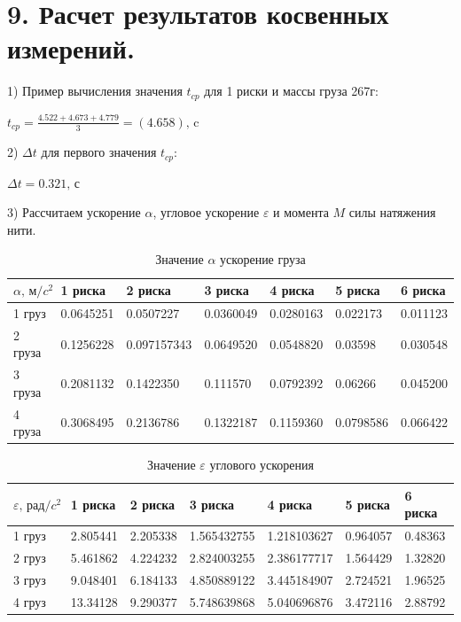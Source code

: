 \documentclass[14pt]{extreport}
\begin{document}
\section*{9. Расчет результатов косвенных измерений.}

1) Пример вычисления значения $t_{cp}$ для 1 риски и массы груза 267г:\\
\begin{center}
$t_{cp} = \frac{4.522 + 4.673 + 4.779}{3} = (4.658)\text{, c}$ \\
\end{center}

2) $\Delta t$ для первого значения $t_{cp}$: \\
\begin{center}
    $\Delta t = 0.321 \textbf{, с}$
\end{center}

3) Рассчитаем ускорение $\alpha$, угловое ускорение $\varepsilon$ и момента $M$ силы натяжения нити.

\begin{table}[!ht]
    \centering
    \begin{tabular}{|l|l|l|l|l|l|l|}
    \hline
        $\alpha \text{, м/}c^2$ & 1 риска & 2 риска & 3 риска & 4 риска & 5 риска & 6 риска  \\ \hline
        1 груз & 0.0645251 & 0.0507227 & 0.0360049 & 0.0280163 & 0.022173 & 0.011123 \\ \hline
        2 груза & 0.1256228 & 0.097157343 & 0.0649520 & 0.0548820 & 0.03598 & 0.030548  \\ \hline
        3 груза & 0.2081132 & 0.1422350 & 0.111570 & 0.0792392 & 0.06266 & 0.045200 \\ \hline
        4 груза & 0.3068495 & 0.2136786 & 0.1322187 & 0.1159360 & 0.0798586 & 0.066422\\ \hline
    \end{tabular}
    \caption{Значение $\alpha$ ускорение груза}
\end{table}

\begin{table}[!ht]
    \centering
    \begin{tabular}{|l|l|l|l|l|l|l|}
    \hline
        $\varepsilon \text{, рад/$c^2$}$ & 1 риска & 2 риска & 3 риска & 4 риска & 5 риска & 6 риска  \\ \hline
        1 груз & 2.805441 & 2.205338 & 1.565432755 & 1.218103627 & 0.964057 & 0.48363  \\ \hline
        2 груз & 5.461862 & 4.224232 & 2.824003255 & 2.386177717 & 1.564429 & 1.32820 \\ \hline
        3 груз & 9.048401 & 6.184133 & 4.850889122 & 3.445184907 & 2.724521 & 1.96525 \\ \hline
        4 груз & 13.34128 & 9.290377 & 5.748639868 & 5.040696876 & 3.472116 & 2.88792 \\ \hline
    \end{tabular}
    \caption{Значение $\varepsilon$ углового ускорения}
\end{table}
\end{document}

